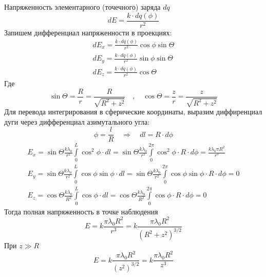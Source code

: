 \documentclass[a5paper,10pt]{article}
\begin{document}
Напряженность элементарного (точечного) заряда $dq$
\begin{equation}
	dE=\frac{k\cdot dq(\phi)}{r^2}
\end{equation}
Запишем дифференциал напряженности в проекциях:
\begin{gather}
	dE_x=\frac{k\cdot dq(\phi)}{r^2}\cos\phi\sin\Theta\\
	dE_y=\frac{k\cdot dq(\phi)}{r^2}\sin\phi\sin\Theta\\
	dE_z=\frac{k\cdot dq(\phi)}{r^2}\cos\Theta
\end{gather}
Где
\begin{equation}
	\sin\Theta=\frac{R}{r}=\frac{R}{\sqrt{R^2+z^2}}\quad, \quad
	\cos\Theta=\frac{z}{r}=\frac{z}{\sqrt{R^2+z^2}}
\end{equation}
Для перевода интегрирования в сферические координаты, выразим диффиренциал дуги через дифференциал азимутального угла:
\begin{equation}
	\phi=\frac{l}{R}
	\quad\Rightarrow\quad	
	dl=R\cdot d\phi
\end{equation}
\begin{gather}
	E_x=\sin\Theta
		\frac{k\lambda_0}{r^2}
		\int\limits_{0}^{L}   	
		\cos^2\phi \cdot dl=
		\sin\Theta%
		\frac{k\lambda_0}{r^2}
		\int\limits_{0}^{2\pi}
		\cos^2\phi \cdot R\cdot d\phi=
		\frac{k\lambda_0\pi R^2}{r^3}\\
	E_y=\sin\Theta
		\frac{k\lambda_0}{r^2}
		\int\limits_{0}^{L}   	
		\cos\phi\sin\phi \cdot dl=
		\sin\Theta%
		\frac{k\lambda_0}{r^2}
		\int\limits_{0}^{2\pi}   	
		\cos\phi\sin\phi \cdot R\cdot d\phi=
		0\\		
	E_z=\cos\Theta
		\frac{k\lambda_0}{R^2}
		\int\limits_{0}^{L}   	
		\cos\phi\cdot dl=
		\cos\Theta%
		\frac{k\lambda_0}{R^2}
		\int\limits_{0}^{2\pi}   	
		\cos\phi\cdot R\cdot d\phi=
		0
\end{gather}
Тогда полная напряженность в точке наблюдения
\begin{equation}
	E=
	k\frac{\pi\lambda_0R^2}{r^3}=
	k\frac{\pi\lambda_0R^2}{(R^2+z^2)^{3/2}}
\end{equation}
При $z \gg R$
\begin{equation}
	E=
	k\frac{\pi\lambda_0R^2}{(z^2)^{3/2}}=
	k\frac{\pi\lambda_0R^2}{z^3}
\end{equation}
\end{document}

